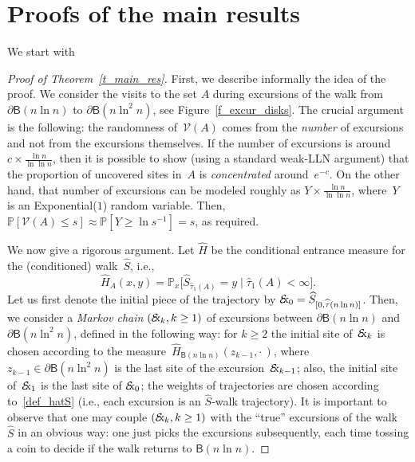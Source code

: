 \documentclass[11pt]{article}
\theoremstyle{definition}
\numberwithin{equation}{section}
\numberwithin{figure}{section}
\numberwithin{table}{section}
\newcommand{\1}[1]{{\mathbf 1}{\{#1\}}}
\newcommand{\V}{{\mathcal V}}
\newcommand{\Ex}{{\mathcal{E}\!\!\text{\footnotesize{\textsl{x}}}}}
\newcommand{\s}{{\widehat S}}
\newcommand{\8}{{\infty}}
\newcommand{\IP}{{\mathbb P}}
\newcommand{\hH}{{\widehat H}}
\newcommand{\htau}{\widehat{\tau}}
\newcommand{\B}{{\mathsf B}}
\begin{document}
\section{Proofs of the main results}\label{s_proofs}

We start with

\begin{proof}[Proof of Theorem~\ref{t_main_res}]
First, we describe informally the idea of the proof. We consider the visits to the set $A$ during excursions of the walk from $\partial\B(n\ln n)$ to $\partial\B(n\ln^2 n)$, see Figure~\ref{f_excur_disks}. The crucial argument is the following: the randomness of~$\V(A)$ comes from the \emph{number} of excursions and not from the excursions themselves. If the number of excursions is around $c\times\frac{\ln n}{\ln\ln n}$, then it is possible to show (using a standard weak-LLN argument) that the proportion of uncovered sites in~$A$ is \emph{concentrated} around~$e^{-c}$. On the other hand, that number of excursions can be modeled roughly as $Y \times\frac{\ln n}{\ln\ln n}$, where~$Y$ is an Exponential($1$) random variable. Then, $\IP[\V(A)\leq s]\approx \IP[Y\geq \ln s^{-1}]=s$, as required.

We now give a rigorous argument. Let $\hH$ be the conditional entrance measure for the (conditioned) walk~$\s$, i.e.,
\begin{equation}\label{df_hatH}
\hH_A(x,y) = \IP_x\big[\s_{\htau_1(A)}=y \mid \htau_1(A)<\infty\big].
\end{equation}
Let us first denote the initial piece of the trajectory by $\Ex_0=\s_{[0,\htau(n\ln n)]}$. Then, we consider a \emph{Markov chain} $(\Ex_k,k\geq 1)$ of excursions between $\partial\B(n\ln n)$ and $\partial\B(n\ln^2 n)$, defined in the following way: for $k\geq 2$ the initial site of~$\Ex_k$ is chosen according to the measure~$\hH_{\B(n\ln n)}(z_{k-1},\cdot\,)$, where $z_{k-1}\in\partial\B(n\ln^2 n)$ is the last site of the excursion~$\Ex_{k-1}$; also, the initial site of~$\Ex_1$ is the last site of $\Ex_0$; the weights of trajectories are chosen according to~\eqref{def_hatS} (i.e., each excursion is an $\s$-walk trajectory). It is important to observe that one may couple $(\Ex_k,k\geq 1)$ with the ``true'' excursions of the walk~$\s$ in an obvious way: one just picks the excursions subsequently, each time tossing a coin to decide if the walk returns to $\B(n\ln n)$.


\end{proof}
\end{document}
